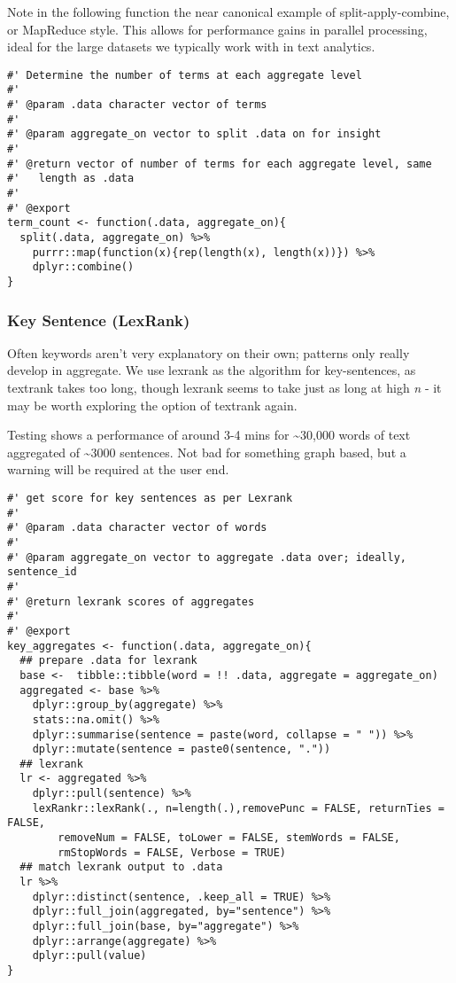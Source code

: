 \documentclass[a4paper, 11pt]{article}
\begin{document}
Note in the following function the near canonical example of
split-apply-combine, or MapReduce style. This allows for performance
gains in parallel processing, ideal for the large datasets we
typically work with in text analytics.
\begin{verbatim}
#' Determine the number of terms at each aggregate level
#'
#' @param .data character vector of terms
#'
#' @param aggregate_on vector to split .data on for insight
#'
#' @return vector of number of terms for each aggregate level, same
#'   length as .data
#'
#' @export
term_count <- function(.data, aggregate_on){
  split(.data, aggregate_on) %>%
    purrr::map(function(x){rep(length(x), length(x))}) %>%
    dplyr::combine()
}
\end{verbatim}
\subsubsection{Key Sentence (LexRank)}
\label{sec:org71dc6af}
Often keywords aren't very explanatory on their own; patterns only
really develop in aggregate. We use lexrank as the algorithm for
key-sentences, as textrank takes too long, though lexrank seems to
take just as long at high \emph{n} - it may be worth exploring the option
of textrank again.

Testing shows a performance of around 3-4 mins for \textasciitilde{}30,000 words of
text aggregated of \textasciitilde{}3000 sentences. Not bad for something graph based,
but a warning will be required at the user end.
\begin{verbatim}
#' get score for key sentences as per Lexrank
#'
#' @param .data character vector of words
#'
#' @param aggregate_on vector to aggregate .data over; ideally, sentence_id
#'
#' @return lexrank scores of aggregates
#'
#' @export
key_aggregates <- function(.data, aggregate_on){
  ## prepare .data for lexrank
  base <-  tibble::tibble(word = !! .data, aggregate = aggregate_on)
  aggregated <- base %>%
    dplyr::group_by(aggregate) %>%
    stats::na.omit() %>%
    dplyr::summarise(sentence = paste(word, collapse = " ")) %>%
    dplyr::mutate(sentence = paste0(sentence, "."))
  ## lexrank
  lr <- aggregated %>%
    dplyr::pull(sentence) %>%
    lexRankr::lexRank(., n=length(.),removePunc = FALSE, returnTies = FALSE,
	    removeNum = FALSE, toLower = FALSE, stemWords = FALSE,
	    rmStopWords = FALSE, Verbose = TRUE)
  ## match lexrank output to .data
  lr %>%
    dplyr::distinct(sentence, .keep_all = TRUE) %>% 
    dplyr::full_join(aggregated, by="sentence") %>%
    dplyr::full_join(base, by="aggregate") %>%
    dplyr::arrange(aggregate) %>%
    dplyr::pull(value)
}
\end{verbatim}
\end{document}
